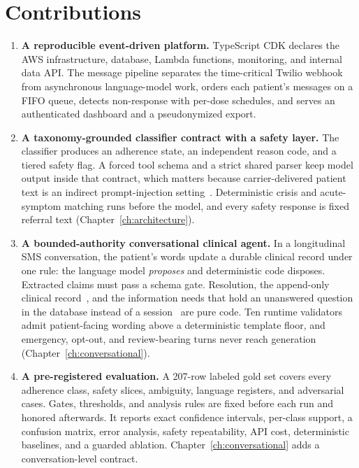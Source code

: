 \section{Contributions}

\begin{enumerate}
  \item \textbf{A reproducible event-driven platform.} TypeScript CDK declares
    the AWS infrastructure, database, Lambda functions, monitoring, and internal
    data API. The message pipeline separates the time-critical Twilio webhook
    from asynchronous language-model work, orders each patient's messages on a
    FIFO queue, detects non-response with per-dose schedules, and serves an
    authenticated dashboard and a pseudonymized export.
  \item \textbf{A taxonomy-grounded classifier contract with a safety layer.}
    The classifier produces an adherence state, an independent reason code,
    and a tiered safety flag. A forced tool schema and a strict shared parser
    keep model output inside that contract, which matters because
    carrier-delivered patient text is an indirect prompt-injection
    setting~\cite{abdelnabi2023indirect}. Deterministic crisis and
    acute-symptom matching runs before the model, and every safety response is
    fixed referral text (Chapter~\ref{ch:architecture}).
  \item \textbf{A bounded-authority conversational clinical agent.} In a
    longitudinal SMS conversation, the patient's words update a durable clinical record under one rule: the
    language model \emph{proposes} and deterministic code disposes. Extracted claims
    must pass a schema gate. Resolution, the append-only clinical
    record~\cite{fowler2005eventsourcing}, and the information needs that hold
    an unanswered question in the database instead of a
    session~\cite{balaraman2021dst} are pure code. Ten runtime validators admit
    patient-facing wording above a deterministic template floor, and
    emergency, opt-out, and review-bearing turns never reach generation
    (Chapter~\ref{ch:conversational}).
  \item \textbf{A pre-registered evaluation.} A 207-row labeled gold set
    covers every adherence class, safety slices, ambiguity, language
    registers, and adversarial cases. Gates, thresholds, and analysis rules are fixed before each run and honored afterwards. It
    reports exact confidence intervals, per-class support, a
    confusion matrix, error analysis, safety repeatability, API cost,
    deterministic baselines, and a guarded ablation.
    Chapter~\ref{ch:conversational} adds a conversation-level contract.
\end{enumerate}
